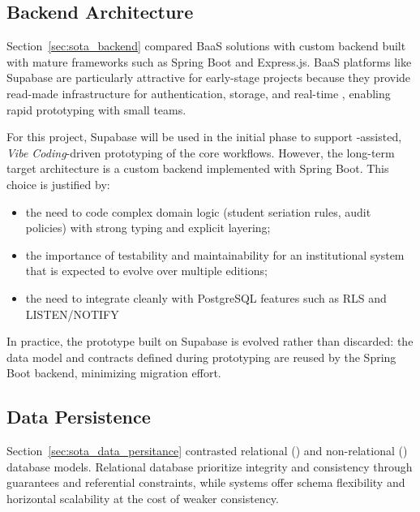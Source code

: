     \subsection{Backend Architecture}
        {
            Section~\ref{sec:sota_backend} compared \gls{BaaS} solutions with custom backend built with mature frameworks such as Spring Boot and Express.js. 
            \gls{BaaS} platforms like Supabase are particularly attractive for early-stage projects because they provide read-made infrastructure
            for authentication, storage, and real-time , enabling rapid prototyping with small teams.
        }

        {
            For this project, Supabase will be used in the initial phase to support -assisted, \textit{Vibe Coding}-driven prototyping of the core workflows.
            However, the long-term target architecture is a custom backend implemented with Spring Boot. 
            This choice is justified by:
        }
        \begin{itemize}
            \item {the need to code complex domain logic (student seriation rules, audit policies) with strong typing and explicit layering;}
            \item {the importance of testability and maintainability for an institutional system that is expected to evolve over multiple editions;}
            \item {the need to integrate cleanly with PostgreSQL features such as \gls{RLS} and LISTEN/NOTIFY}
        \end{itemize}
        {
            In practice, the prototype built on Supabase is evolved rather than discarded: the data model and  contracts defined during
            prototyping are reused by the Spring Boot backend, minimizing migration effort.
        }
    \subsection{Data Persistence}
        {
            Section~\ref{sec:sota_data_persitance} contrasted relational () and non-relational () database models. 
            Relational database prioritize integrity and consistency through  guarantees and referential constraints, while
             systems offer schema flexibility and horizontal scalability at the cost of weaker consistency.
        }
        
